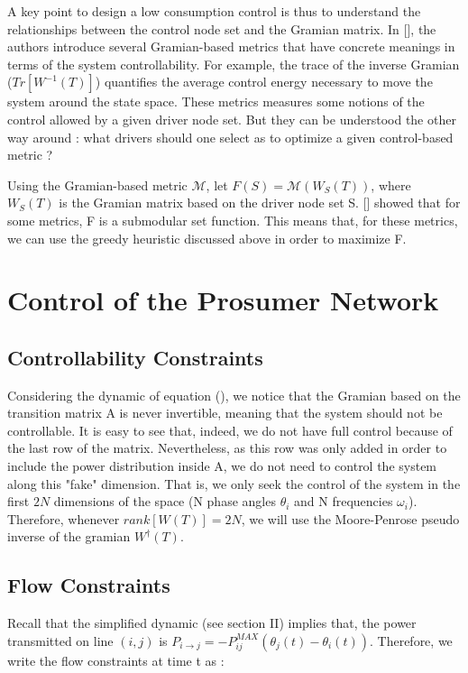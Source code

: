 \documentclass[conference]{IEEEtran}
\begin{document}
A key point to design a low consumption control is thus to understand the relationships between the control node set and the Gramian matrix. In [], the authors introduce several Gramian-based metrics that have concrete meanings in terms of the system controllability. For example, the trace of the inverse Gramian ($ Tr[ W^{-1}(T)] $) quantifies the average control energy necessary to move the system around the state space. These metrics measures some notions of the control allowed by a given driver node set. But they can be understood the other way around : what drivers should one select as to optimize a given control-based metric ? 

Using the Gramian-based metric $ \mathcal{M} $, let $ F(S) =\mathcal{M}(W_S(T))$, where $ W_S(T) $  is the Gramian matrix based on the driver node set S. [] showed that for some metrics, F is a submodular set function. This means that, for these metrics, we can use the greedy heuristic discussed above in order to maximize F.



\section{Control of the Prosumer Network}
\label{sec:Control_prosumer}

\subsection{Controllability Constraints}

 Considering the dynamic of equation (), we notice that the Gramian based on the transition matrix A is never invertible, meaning that the system should not be controllable. It is easy to see that, indeed, we do not have full control because of the last row of the matrix. Nevertheless, as this row was only added in order to include the power distribution inside A, we do not need to control the system along this "fake" dimension. That is, we only seek the control of the system in the first $ 2N $ dimensions of the space (N phase angles $ \theta_i$ and N frequencies $\omega_i$). Therefore, whenever $ rank[ W(T) ] = 2N$, we will use the Moore-Penrose pseudo inverse of the gramian $ W^\dagger(T) $.


\subsection{Flow Constraints}

Recall that the simplified dynamic (see section II) implies that, the power transmitted on line $ (i,j)$ is $ P_{i \longrightarrow j} = -P_{ij}^{MAX} \left( \theta_j(t) - \theta_i(t) \right) $. Therefore, we write the flow constraints at time t as :
\end{document}
